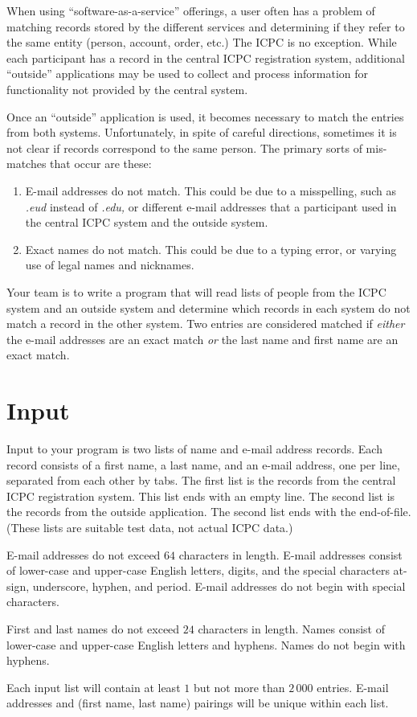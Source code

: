 
\par
When using ``software-as-a-service'' offerings, a user often has a
problem of matching records stored by the different services and
determining if they refer to the same entity (person, account,
order, etc.)  The ICPC is no exception.  While each participant has a
record in the central ICPC registration system, additional ``outside''
applications may be used to collect and process information for
functionality not provided by the central system.
\par
Once an ``outside'' application is used, it becomes necessary to match
the entries from both systems.  Unfortunately, in spite of careful
directions, sometimes it is not clear if records correspond to the
same person.  The primary sorts of mis-matches that occur are these:
\begin{enumerate}
	\item  E-mail addresses do not match.  This could be due to a misspelling,
	such as {\sl .eud} instead of {\sl .edu,} or different e-mail addresses
	that a participant used in the central ICPC system and the outside system.
	\item  Exact names do not match.  This could be due to a typing error, or
	varying use of legal names and nicknames.
	\par
\end{enumerate}
Your team is to write a program that will read lists of people from
the ICPC system and an outside system and determine which records in
each system do not match a record in the other system.  Two entries
are considered matched if {\sl either} the e-mail addresses are an exact
match {\sl or} the last name and first name are an exact match.

\section*{Input}

Input to your program is two lists of name and e-mail address
records.  Each record consists of a first name, a last name, and an
e-mail address, one per line, separated from each other by tabs.  The
first list is the records from the central ICPC registration system.
This list ends with an empty line.  The second list is the records
from the outside application.  The second list ends with the end-of-file.
(These lists are suitable test data, not actual ICPC data.)
\par
E-mail addresses do not exceed $64$ characters in length.
E-mail addresses consist of lower-case and upper-case English letters,
digits, and the special characters at-sign, underscore, hyphen, and
period.  E-mail addresses do not begin with special characters.
\par
First and last names do not exceed $24$ characters in length.  Names
consist of lower-case and upper-case English letters and hyphens.
Names do not begin with hyphens.
\par
Each input list
will contain at least $1$ but not more than $2\,000$ entries.  E-mail addresses
and (first name, last name) pairings will be unique within each list.

